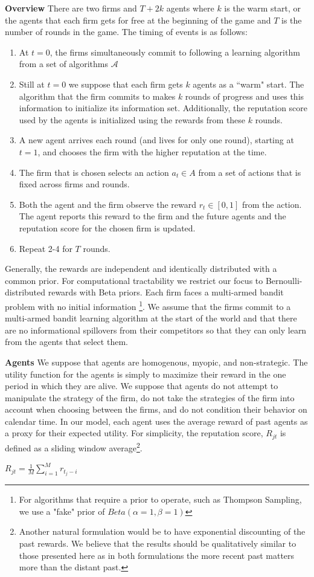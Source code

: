 \documentclass{article}
\theoremstyle{definition}
\begin{document}
\textbf{Overview} There are two firms and $T+2k$ agents where $k$ is the warm start, or the agents that each firm gets for free at the beginning of the game and $T$ is the number of rounds in the game. The timing of events is as follows:
\begin{enumerate}
\item At $t = 0$, the firms simultaneously commit to following a learning algorithm from a set of algorithms $\mathcal{A}$
\item Still at $t = 0$ we suppose that each firm gets $k$ agents as a ``warm" start. The algorithm that the firm commits to makes $k$ rounds of progress and uses this information to initialize its information set. Additionally, the reputation score used by the agents is initialized using the rewards from these $k$ rounds.
\item A new agent arrives each round (and lives for only one round), starting at $t = 1$, and chooses the firm with the higher reputation at the time.
\item The firm that is chosen selects an action $a_{t} \in A$ from a set of actions that is fixed across firms and rounds.
\item Both the agent and the firm observe the reward $r_t \in [0, 1]$ from the action. The agent reports this reward to the firm and the future agents and the reputation score for the chosen firm is updated.
\item Repeat 2-4 for $T$ rounds.
\end{enumerate}

Generally, the rewards are independent and identically distributed with a common prior.  For computational tractability we restrict our focus to Bernoulli-distributed rewards with Beta priors. Each firm faces a multi-armed bandit problem with no initial information \footnote{For algorithms that require a prior to operate, such as Thompson Sampling, we use a "fake" prior of $Beta(\alpha=1,\beta=1)$}. We assume that the firms commit to a multi-armed bandit learning algorithm at the start of the world and that there are no informational spillovers from their competitors so that they can only learn from the agents that select them.

\noindent \textbf{Agents} We suppose that agents are homogenous, myopic, and non-strategic. The utility function for the agents is simply to maximize their reward in the one period in which they are alive. We suppose that agents do not attempt to manipulate the strategy of the firm, do not take the strategies of the firm into account when choosing between the firms, and do not condition their behavior on calendar time. In our model, each agent uses the average reward of past agents as a proxy for their expected utility. For simplicity, the reputation score, $R_{jt}$ is defined as a sliding window average\footnote{Another natural formulation would be to have exponential discounting of the past rewards. We believe that the results should be qualitatively similar to those presented here as in both formulations the more recent past matters more than the distant past.}.
\begin{center}
$R_{jt} = \frac{1}{M} \sum\limits_{i=1}^{M} r_{t_j-i}$
\end{center}
\end{document}
